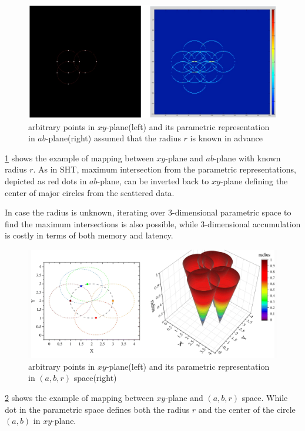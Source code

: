 \documentclass[extendedabs]{bmvc2k}
\begin{document}
\begin{figure}[h]
    \centering
    \includegraphics[width=\linewidth]{hw4_4_2}
    \caption{arbitrary points in $xy$-plane(left) and its parametric representation in $ab$-plane(right)
    assumed that the radius $r$ is known in advance}
    \label{fig:7}
\end{figure}

\figurename{\ref{fig:7}} shows the example of mapping between $xy$-plane and $ab$-plane with known radius $r$.
As in SHT, maximum intersection from the parametric representations, depicted as red dots in $ab$-plane,
can be inverted back to $xy$-plane defining the center of major circles from the scattered data.

In case the radius is unknown, iterating over 3-dimensional parametric space to find the maximum intersections
is also possible, while 3-dimensional accumulation is costly in terms of both memory and latency. 

\begin{figure}[h]
    \centering
    \includegraphics[width=\linewidth]{hw4_4_3}
    \caption{arbitrary points in $xy$-plane(left) and its parametric representation in $(a, b, r)$ space(right)}
    \label{fig:8}
\end{figure}

\figurename{\ref{fig:8}} shows the example of mapping between $xy$-plane and $(a, b, r)$ space. While dot in the
parametric space defines both the radius $r$ and the center of the circle $(a, b)$ in $xy$-plane.
\end{document}
